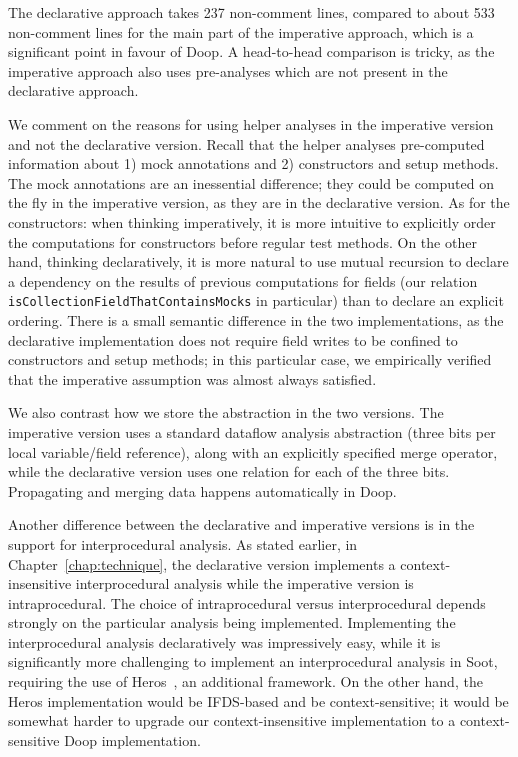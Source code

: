 The declarative approach takes 237 non-comment lines, compared to about 533 non-comment lines for the main part of the imperative approach, which is a significant point in favour of Doop. A head-to-head comparison is tricky, as the imperative approach also uses pre-analyses which are not present in the declarative approach.

We comment on the reasons for using helper analyses in the imperative version and not the declarative version. Recall that the helper analyses pre-computed information about 1) mock annotations and 2) constructors and setup methods. The mock annotations are an inessential difference; they could be computed on the fly in the imperative version, as they are in the declarative version. As for the constructors: when thinking imperatively, it is more intuitive to explicitly order the computations for constructors before regular test methods. On the other hand, thinking declaratively, it is more natural to use mutual recursion to declare a dependency on the results of previous computations for fields (our relation \texttt{isCollectionFieldThatContainsMocks} in particular) than to declare an explicit ordering. There is a small semantic difference in the two implementations, as the declarative implementation does not require field writes to be confined to constructors and setup methods; in this particular case, we empirically verified that the imperative assumption was almost always satisfied.

We also contrast how we store the abstraction in the two versions. The imperative version uses a standard dataflow analysis abstraction (three bits per local variable/field reference), along with an explicitly specified merge operator, while the declarative version uses one relation for each of the three bits. Propagating and merging data happens automatically in Doop.

Another difference between the declarative and imperative versions is in the support for interprocedural analysis. As stated earlier, in Chapter~\ref{chap:technique}, the declarative version implements a context-insensitive interprocedural analysis while the imperative version is intraprocedural. The choice of intraprocedural versus interprocedural depends strongly on the particular analysis being implemented. Implementing the interprocedural analysis declaratively was impressively easy, while it is significantly more challenging to implement an interprocedural analysis in Soot, requiring the use of Heros~\cite{soap12ifds}, an additional framework. On the other hand, the Heros implementation would be IFDS-based and be context-sensitive; it would be somewhat harder to upgrade our context-insensitive implementation to a context-sensitive Doop implementation.

